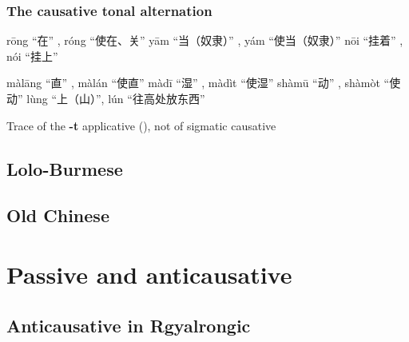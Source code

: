 \documentclass[oneside,a4paper,11pt]{article}
\newcommand{\ipa}[1]{\textbf{{\phon\mbox{#1}}}} %
\newcommand{\zh}[1]{{\cn #1}}
\newcommand{\forme}[2]{\ipa{#1} `#2'}
\begin{document}
\subsubsection{The causative tonal alternation}
rōng “在” , róng “使在、关”
yām “当（奴隶）” , yám “使当（奴隶）”
nōi “挂着” , nói “挂上”


màlāng “直” , màlán “使直”
màdī “湿” , màdìt “使湿”
shàmū “动” , shàmòt “使动”
lùng “上（山）”, lún “往高处放东西”

Trace of the \ipa{-t} applicative (\citealt{michailovsky85dental, jacques15derivational.khaling}), not of sigmatic causative
\subsection{Lolo-Burmese}
\subsection{Old Chinese}


\section{Passive and anticausative}

\subsection{Anticausative in Rgyalrongic}
%
%
%
% 
%
%
% 
% 
% 
% 
% 
%
\end{document}
